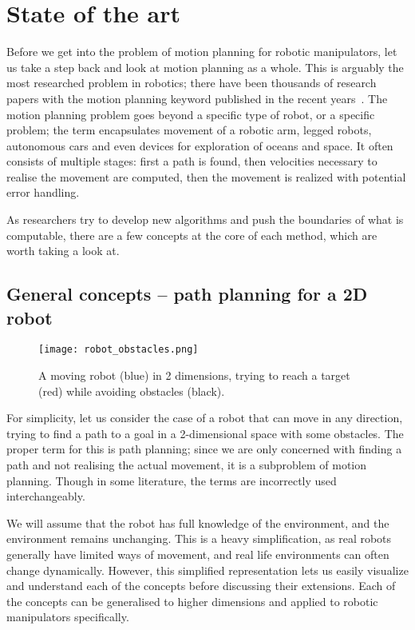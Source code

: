 \chapter{State of the art}\label{SotA}

Before we get into the problem of motion planning for robotic manipulators, let us take a step back and look at motion planning as a whole. This is arguably the most researched problem in robotics; there have been thousands of research papers with the motion planning keyword published in the recent years~\cite{RASreview}. The motion planning problem goes beyond a specific type of robot, or a specific problem; the term encapsulates movement of a robotic arm, legged robots, autonomous cars and even devices for exploration of oceans and space. It often consists of multiple stages: first a path is found, then velocities necessary to realise the movement are computed, then the movement is realized with potential error handling.

As researchers try to develop new algorithms and push the boundaries of what is computable, there are a few concepts at the core of each method, which are worth taking a look at.

\section{General concepts -- path planning for a 2D robot}

\begin{figure}[ht]
    \centering
    \texttt{[image: robot\_obstacles.png]}
  \caption{A moving robot (blue) in 2 dimensions, trying to reach a target (red) while avoiding obstacles (black).}\label{fig:bot}
\end{figure}

For simplicity, let us consider the case of a robot that can move in any direction, trying to find a path to a goal in a 2-dimensional space with some obstacles. The proper term for this is path planning; since we are only concerned with finding a path and not realising the actual movement, it is a subproblem of motion planning. Though in some literature, the terms are incorrectly used interchangeably.

We will assume that the robot has full knowledge of the environment, and the environment remains unchanging. This is a heavy simplification, as real robots generally have limited ways of movement, and real life environments can often change dynamically. However, this simplified representation lets us easily visualize and understand each of the concepts before discussing their extensions. Each of the concepts can be generalised to higher dimensions and applied to robotic manipulators specifically.

